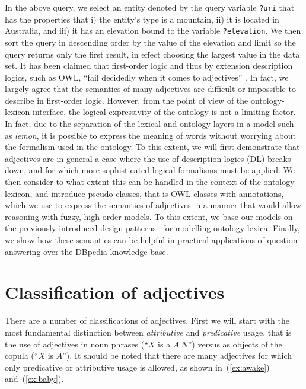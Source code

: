 \documentclass[11pt]{article}
\begin{document}
In the above query, we select an entity denoted by the query variable \texttt{?uri}
that has the properties that i) the entity's type is a mountain, ii) it is located in Australia,
and iii) it has an elevation bound to the variable \texttt{?elevation}. We then sort the
query in descending order by the value of the elevation and limit so the query returns
only the first result, in effect choosing the largest value in the data set.
It has been claimed that first-order logic and thus by extension description 
logics, such as OWL, ``fail decidedly when it comes to adjectives''
\cite{bankston2003modeling}. In fact, we largely agree that the semantics 
of many adjectives are difficult or impossible to describe in first-order logic. 
However, from the point of view of the ontology-lexicon interface, the logical 
expressivity of the ontology is not a limiting factor. In fact, due to the 
separation of the lexical and ontology layers in a model such as \emph{lemon}, 
it is possible to express the meaning of words without worrying about the 
formalism used in the ontology. To this extent, we will first demonstrate that 
adjectives are in general a case where the use of description logics (DL) breaks down, 
and for which more sophisticated logical formalisms must be applied. We then 
consider to what extent this can be handled in the context of the 
ontology-lexicon, and introduce pseudo-classes, that is OWL classes with 
annotations, which we use to express the semantics of adjectives in a manner
that would allow reasoning with fuzzy, high-order models. To this extent, we base
our models on the previously introduced design patterns~\cite{mccrae2014design}
for modelling ontology-lexica. 
Finally, we show how these semantics can be helpful in practical applications 
of question answering over the DBpedia knowledge base.

\section{Classification of adjectives}

There are a number of classifications of adjectives. First we will start 
with the most fundamental distinction between \emph{attributive} and 
\emph{predicative} usage, that is the use of adjectives in noun phrases 
(``$X$ is a $A~N$'') versus as objects of the copula (``$X$ is $A$''). 
It should be noted that there are many adjectives for which only predicative or 
attributive usage is allowed, as shown in~(\ref{ex:awake}) and~(\ref{ex:baby}).
\end{document}

